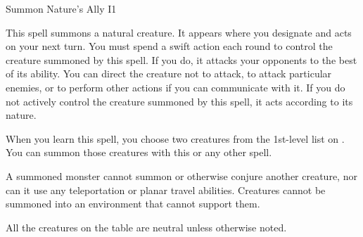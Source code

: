 \begin{spellsection}{Summon Nature's Ally I}{1}\hypertarget{spell:summon nature's ally}{}
    \begin{spellheader}
    \end{spellheader}
    \begin{spellcontent}
        \begin{spelltargetinginfo}
            \spellrng{\rngclose}
        \end{spelltargetinginfo}
        \begin{spelleffects}
            \spelleffect This spell summons a natural creature. It appears where you designate and acts on your next turn. You must spend a swift action each round to control the creature summoned by this spell. If you do, it attacks your opponents to the best of its ability. You can direct the creature not to attack, to attack particular enemies, or to perform other actions if you can communicate with it. If you do not actively control the creature summoned by this spell, it acts according to its nature.
            \par When you learn this spell, you choose two creatures from the 1st-level list on . You can summon those creatures with this or any other  spell.
            \par A summoned monster cannot summon or otherwise conjure another creature, nor can it use any teleportation or planar travel abilities. Creatures cannot be summoned into an environment that cannot support them.
            \par All the creatures on the table are neutral unless otherwise noted.
            \spelldur \durshort \dismissable
        \end{spelleffects}
    \end{spellcontent}
    \begin{spellfooter}
        \miscastexplode
    \end{spellfooter}
\end{spellsection}

